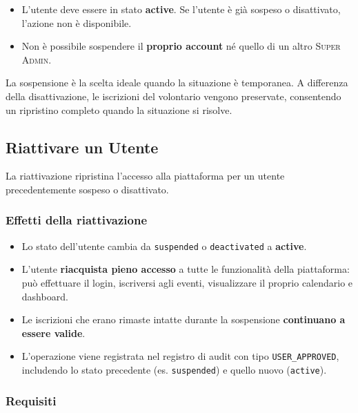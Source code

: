 \documentclass[a4paper,11pt,oneside]{book}
\newcommand{\ruolo}[1]{\textsc{#1}}
\begin{document}
\begin{itemize}[leftmargin=1.5em]
  \item L'utente deve essere in stato \textbf{active}. Se l'utente \`e gi\`a sospeso o disattivato, l'azione non \`e disponibile.
  \item Non \`e possibile sospendere il \textbf{proprio account} n\'e quello di un altro \ruolo{Super Admin}.
\end{itemize}

\begin{tipbox}
La sospensione \`e la scelta ideale quando la situazione \`e temporanea. A differenza della disattivazione, le iscrizioni del volontario vengono preservate, consentendo un ripristino completo quando la situazione si risolve.
\end{tipbox}

\subsection{Riattivare un Utente}
\label{sec:riattivare-utente}

La riattivazione ripristina l'accesso alla piattaforma per un utente precedentemente sospeso o disattivato.

\subsubsection{Effetti della riattivazione}

\begin{itemize}[leftmargin=1.5em]
  \item Lo stato dell'utente cambia da \texttt{suspended} o \texttt{deactivated} a \textbf{active}.
  \item L'utente \textbf{riacquista pieno accesso} a tutte le funzionalit\`a della piattaforma: pu\`o effettuare il login, iscriversi agli eventi, visualizzare il proprio calendario e dashboard.
  \item Le iscrizioni che erano rimaste intatte durante la sospensione \textbf{continuano a essere valide}.
  \item L'operazione viene registrata nel registro di audit con tipo \texttt{USER\_APPROVED}, includendo lo stato precedente (es. \texttt{suspended}) e quello nuovo (\texttt{active}).
\end{itemize}

\subsubsection{Requisiti}
\end{document}
